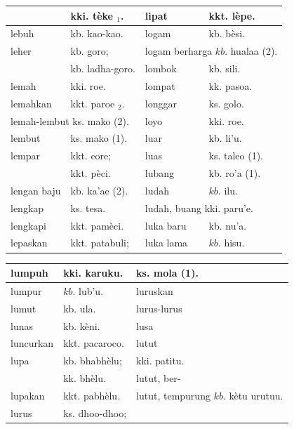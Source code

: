 \documentclass[10pt]{article}
\begin{document}
\begin{center}
\begin{tabular}{|l|l|l|l|}
\hline
 & kki. tèke \({ }_{1}\). & lipat & kkt. lèpe. \\
\hline
lebuh & kb. kao-kao. & logam & kb. bèsi. \\
\hline
leher & kb. goro; & \multicolumn{2}{|c|}{logam berharga \(k b\). hualaa (2).} \\
\hline
 & kb. ladha-goro. & lombok & kb. sili. \\
\hline
lemah & kki. roe. & lompat & kk. pasoa. \\
\hline
lemahkan & kkt. paroe \(_{2}\). & longgar & ks. golo. \\
\hline
\multicolumn{2}{|l|}{lemah-lembut ks. mako (2).} & loyo & kki. roe. \\
\hline
lembut & ks. mako (1). & luar & kb. li'u. \\
\hline
lempar & kkt. core; & luas & ks. taleo (1). \\
\hline
 & kkt. pèci. & lubang & kb. ro'a (1). \\
\hline
lengan baju & kb. ka'ae (2). & ludah & \(k b\). ilu. \\
\hline
lengkap & ks. tesa. & \multicolumn{2}{|l|}{ludah, buang kki. paru'e.} \\
\hline
lengkapi & kkt. pamèci. & luka baru & kb. nu'a. \\
\hline
lepaskan & kkt. patabuli; & luka lama & \(k b\). hisu. \\
\hline
\end{tabular}
\end{center}

\begin{center}
\begin{tabular}{|l|l|l|}
\hline
lumpuh & kki. karuku. & ks. mola (1). \\
\hline
lumpur & \(k b\). lub'u. & luruskan \\
\hline
lumut & kb. ula. & lurus-lurus \\
\hline
lunas & kb. kèni. & lusa \\
\hline
luncurkan & kkt. pacaroco. & lutut \\
\hline
lupa & kb. bhabhèlu; & kki. patitu. \\
\hline
 & kk. bhèlu. & lutut, ber- \\
\hline
lupakan & kkt. pabhèlu. & lutut, tempurung \(k b\). kètu urutuu. \\
\hline
lurus & ks. dhoo-dhoo; &  \\
\hline
\end{tabular}
\end{center}
\end{document}
